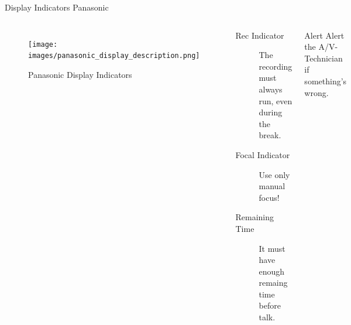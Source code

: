 \documentclass[aspectratio=169]{beamer}
\begin{document}
\begin{frame}{Display Indicators Panasonic}
	\begin{columns}[T,onlytextwidth]
	\begin{figure} 
		\centering
		\texttt{[image: images/panasonic\_display\_description.png]}
		\caption{Panasonic Display Indicators}
	\end{figure}
		\begin{description}
			\item[Rec Indicator] The recording must always run, even during the break.
			\item[Focal Indicator] Use only manual focus!
			\item[Remaining Time] It must have enough remaing time before talk.
		\end{description}
		\begin{alertblock}{Alert}
			Alert the A/V-Technician if something's wrong.
		\end{alertblock}
	\end{columns}
\end{frame}



%
\end{document}
